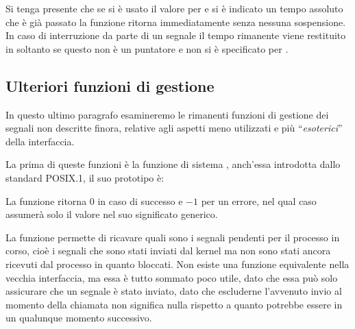 Si tenga presente che se si è usato il valore 
per  e si è indicato un tempo assoluto che è già passato la
funzione ritorna immediatamente senza nessuna sospensione. In caso di
interruzione da parte di un segnale il tempo rimanente viene restituito
in  soltanto se questo non è un puntatore  e non si è
specificato  per .





\subsection{Ulteriori funzioni di gestione}
\label{sec:sig_specific_features}

In questo ultimo paragrafo esamineremo le rimanenti funzioni di gestione dei
segnali non descritte finora, relative agli aspetti meno utilizzati e più
``\textsl{esoterici}'' della interfaccia.


La prima di queste funzioni è la funzione di sistema ,
anch'essa introdotta dallo standard POSIX.1, il suo prototipo è:

\begin{funcproto}{
}

{La funzione ritorna $0$ in caso di successo e $-1$ per un errore, nel qual
  caso  assumerà solo il valore  nel suo
  significato generico.}
\end{funcproto}

La funzione permette di ricavare quali sono i segnali pendenti per il processo
in corso, cioè i segnali che sono stati inviati dal kernel ma non sono stati
ancora ricevuti dal processo in quanto bloccati. Non esiste una funzione
equivalente nella vecchia interfaccia, ma essa è tutto sommato poco utile,
dato che essa può solo assicurare che un segnale è stato inviato, dato che
escluderne l'avvenuto invio al momento della chiamata non significa nulla
rispetto a quanto potrebbe essere in un qualunque momento successivo.

